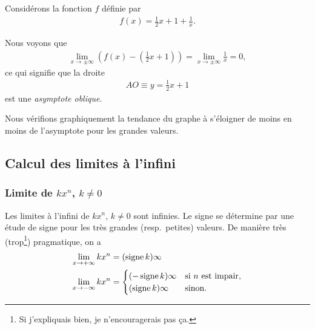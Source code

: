 \documentclass[main.tex]{subfiles}
\begin{document}
\begin{example}

    Considérons la fonction $f$ définie par
    \begin{align}
        f(x) = \frac 1 2 x + 1 + \frac 1 x.
    \end{align}

    Nous voyons que
    \begin{align}
        \lim_{x \to \pm \infty} (f(x) - (\frac 1 2 x + 1)) = \lim_{x \to \pm \infty} \frac 1 x = 0,
    \end{align}
    ce qui signifie que la droite
    \begin{align}
        AO \equiv y = \frac 1 2 x + 1
    \end{align}
    est une \emph{asymptote oblique}.

    Nous vérifions graphiquement la tendance du graphe à s'éloigner de moins en moins de l'asymptote pour les grandes valeurs.
    \begin{center}
        \begin{plot}{0.25}{-12}{-12}{12}{12}
        \end{plot}
    \end{center}
\end{example}

\subsection{Calcul des limites à l'infini}

\subsubsection{Limite de $k x^n$, $k \neq 0$}

Les limites à l'infini de $k x^n$, $k \neq 0$ sont infinies.
Le signe se détermine par une étude de signe pour les très grandes (resp.\ petites) valeurs.
De manière très (trop\footnote{Si j'expliquais bien, je n'encouragerais pas ça.}) pragmatique,
on a
\begin{align*}
    \lim_{x \to +\infty} k x^n &= (\operatorname{signe} k) \infty\\
    \lim_{x \to -\infty} k x^n &=
    \begin{cases}
        (-\operatorname{signe} k) \infty & \text{si}\ n\ \text{est impair,} \\
        (\operatorname{signe} k) \infty & \text{sinon.}
    \end{cases}
\end{align*}
\end{document}
